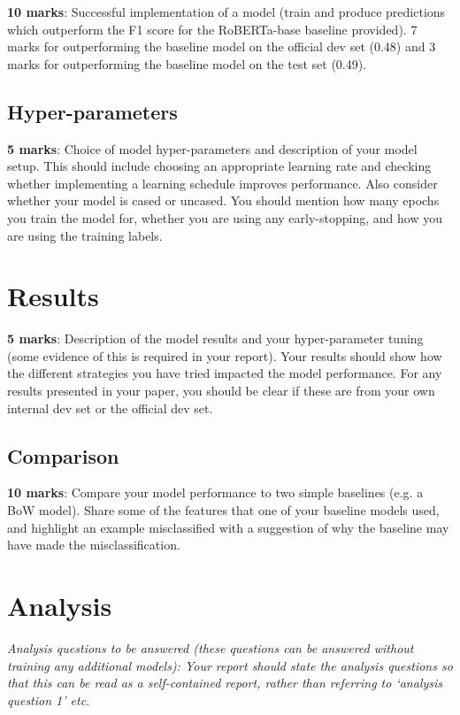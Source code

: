 \documentclass[11pt,a4paper]{article}
\begin{document}
\textbf{10 marks}: Successful implementation of a model (train and produce predictions which outperform the F1 score for the RoBERTa-base baseline provided). 7 marks for outperforming the baseline model on the official dev set (0.48) and 3 marks for outperforming the baseline model on the test set (0.49).

\subsection{Hyper-parameters}

\textbf{5 marks}: Choice of model hyper-parameters and description of your model setup. This should include choosing an appropriate learning rate and checking whether implementing a learning schedule improves performance. Also consider whether your model is cased or uncased. You should mention how many epochs you train the model for, whether you are using any early-stopping, and how you are using the training labels.

\section{Results}

\textbf{5 marks}: Description of the model results and your hyper-parameter tuning (some evidence of this is required in your report). Your results should show how the different strategies you have tried impacted the model performance. For any results presented in your paper, you should be clear if these are from your own internal dev set or the official dev set.

\subsection{Comparison}

\textbf{10 marks}: Compare your model performance to two simple baselines (e.g. a BoW model). Share some of the features that one of your baseline models used, and highlight an example misclassified with a suggestion of why the baseline may have made the misclassification.

\section{Analysis}

\emph{Analysis questions to be answered (these questions can be answered without training any additional models): Your report should state the analysis questions so that this can be read as a self-contained report, rather than referring to ‘analysis question 1’ etc.}
\end{document}
